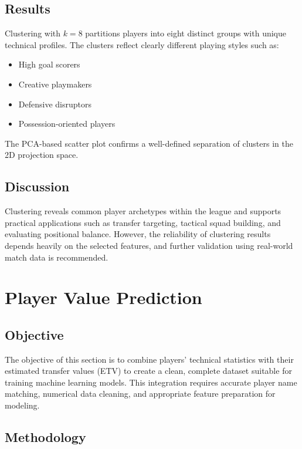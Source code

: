 \documentclass[12pt,a4paper]{article}
\begin{document}
\subsection{Results}
Clustering with $k = 8$ partitions players into eight distinct groups with unique technical profiles. The clusters reflect clearly different playing styles such as:
\begin{itemize}
    \item High goal scorers
    \item Creative playmakers
    \item Defensive disruptors
    \item Possession-oriented players
\end{itemize}
The PCA-based scatter plot confirms a well-defined separation of clusters in the 2D projection space.

\subsection{Discussion}
Clustering reveals common player archetypes within the league and supports practical applications such as transfer targeting, tactical squad building, and evaluating positional balance. However, the reliability of clustering results depends heavily on the selected features, and further validation using real-world match data is recommended.


\section{Player Value Prediction}

\subsection{Objective}
The objective of this section is to combine players' technical statistics with their estimated transfer values (ETV) to create a clean, complete dataset suitable for training machine learning models. This integration requires accurate player name matching, numerical data cleaning, and appropriate feature preparation for modeling.

\subsection{Methodology}
\end{document}
